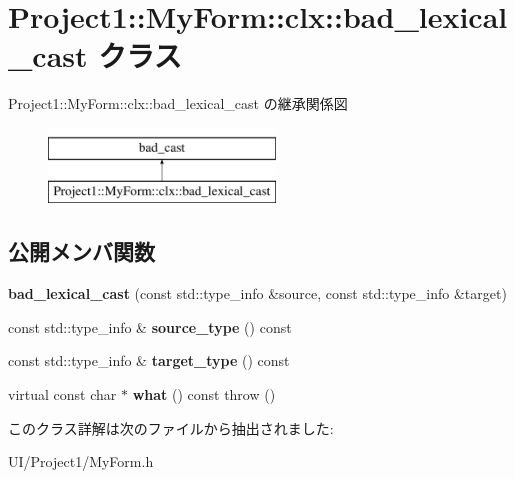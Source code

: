 \hypertarget{class_project1_1_1_my_form_1_1clx_1_1bad__lexical__cast}{}\section{Project1\+:\+:My\+Form\+:\+:clx\+:\+:bad\+\_\+lexical\+\_\+cast クラス}
\label{class_project1_1_1_my_form_1_1clx_1_1bad__lexical__cast}
Project1\+:\+:My\+Form\+:\+:clx\+:\+:bad\+\_\+lexical\+\_\+cast の継承関係図\begin{figure}[H]
\begin{center}
\leavevmode
\includegraphics[height=2.000000cm]{class_project1_1_1_my_form_1_1clx_1_1bad__lexical__cast}
\end{center}
\end{figure}
\subsection*{公開メンバ関数}
\begin{DoxyCompactItemize}
\item 
\mbox{\label{class_project1_1_1_my_form_1_1clx_1_1bad__lexical__cast_a29c933b0a71e3390a729febcc4359635}} 
{\bfseries bad\+\_\+lexical\+\_\+cast} (const std\+::type\+\_\+info \&source, const std\+::type\+\_\+info \&target)
\item 
\mbox{\label{class_project1_1_1_my_form_1_1clx_1_1bad__lexical__cast_ac753f53410a8a4ed06c21654ce76d5b3}} 
const std\+::type\+\_\+info \& {\bfseries source\+\_\+type} () const
\item 
\mbox{\label{class_project1_1_1_my_form_1_1clx_1_1bad__lexical__cast_ae0b07193cfe892db01fc8b4fb236d495}} 
const std\+::type\+\_\+info \& {\bfseries target\+\_\+type} () const
\item 
\mbox{\label{class_project1_1_1_my_form_1_1clx_1_1bad__lexical__cast_a0935bb29f2da56fd7e44d398769cef4a}} 
virtual const char $\ast$ {\bfseries what} () const  throw ()
\end{DoxyCompactItemize}


このクラス詳解は次のファイルから抽出されました\+:\begin{DoxyCompactItemize}
\item 
U\+I/\+Project1/My\+Form.\+h\end{DoxyCompactItemize}
